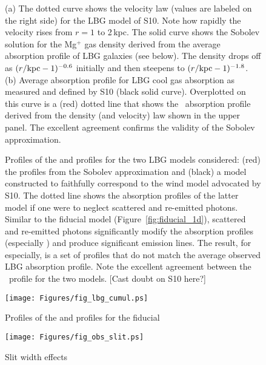 \documentclass[12pt,preprint]{aastex}
\begin{document}
\begin{figure}
\caption{
(a) The dotted curve shows the velocity law (values are labeled on the
right side) for the LBG model
of S10.  Note how rapidly the velocity rises from $r =
1$ to 2\,kpc.  The solid curve shows the Sobolev solution for the
Mg$^+$ gas
density derived from 
the average absorption profile of LBG galaxies (see below).
The density drops off as $(r/{\rm kpc}-1)^{-0.6}$ initially and then
steepens to $(r/{\rm kpc}-1)^{-1.8}$.
(b) Average absorption profile for LBG cool gas absorption as
measured and defined by S10
(black solid curve).  Overplotted on this curve is a (red) dotted line that
shows the \mgiia\ absorption profile derived from the density (and velocity)
law shown in the upper panel.  The excellent agreement confirms the
validity of the Sobolev approximation.
}
\label{fig:LBG_Sobolev}
\end{figure}

\clearpage

\begin{figure}
\caption{
Profiles of the  and  profiles for the two
LBG models considered: (red) the profiles from the 
Sobolev approximation 
and (black) a model constructed to faithfully
correspond to the wind model advocated by S10.  The dotted line
shows the absorption profiles of the latter model if one were
to neglect scattered and re-emitted photons.  Similar to the fiducial
model (Figure~\ref{fig:fiducial_1d}), scattered and re-emitted photons
significantly modify the absorption profiles (especially )
and produce significant emission lines.  
The result, for  especially, is a set of profiles that do
not match the average observed LBG absorption profile.
Note the excellent agreement
between the \mgiia\ profile for the two models. [Cast doubt on S10
here?]
}
\label{fig:LBG_spec}
\end{figure}

\begin{figure}
\texttt{[image: Figures/fig\_lbg\_cumul.ps]}
\caption{
Profiles of the  and  profiles for the fiducial
}
\label{fig:LBG_cumul}
\end{figure}

\begin{figure}
\texttt{[image: Figures/fig\_obs\_slit.ps]}
\caption{
Slit width effects
}
\label{fig:obs_slit}
\end{figure}
\end{document}
